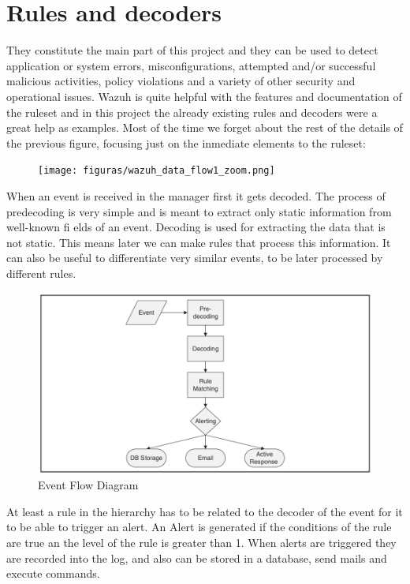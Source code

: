 \section{Rules and decoders}
They constitute the main part of this project and they can be used to detect application or system errors, misconfigurations, attempted and/or successful malicious activities, policy violations and a variety of other security and operational issues\cite{wazuh_index}. Wazuh is quite helpful with the features and documentation of the ruleset and in this project the already existing rules and decoders were a great help as examples.
\linej
\linej
Most of the time we forget about the rest of the details of the previous figure, focusing just on the inmediate elements to the ruleset:
\begin{figure}[H]
  \centering
	\texttt{[image: figuras/wazuh\_data\_flow1\_zoom.png]}
\end{figure}
\linej
When an event is received in the manager first it gets decoded. The process of predecoding is very simple and is meant to extract only static information from well-known fi elds of an event.
Decoding is used for extracting the data that is not static. This means later we can make rules that process this information. It can also be useful to differentiate very similar events, to be later processed by different rules.
\begin{figure}[H]
  \centering
	\includegraphics[width=\textwidth]{figuras/Event_Flow.png}
	\caption{Event Flow Diagram}
\end{figure}
\linej
At least a rule in the hierarchy has to be related to the decoder of the event for it to be able to trigger an alert. An Alert is generated if the conditions of the rule are true an the level of the rule is greater than 1.
\linej
When alerts are triggered they are recorded into the log, and also can be stored in a database, send mails and execute commands\cite{libro_ossec}.

